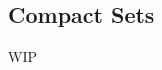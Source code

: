 \documentclass[../poma-notes.tex]{subfiles}
\begin{document}
\subsection*{Compact Sets}

WIP
\end{document}
